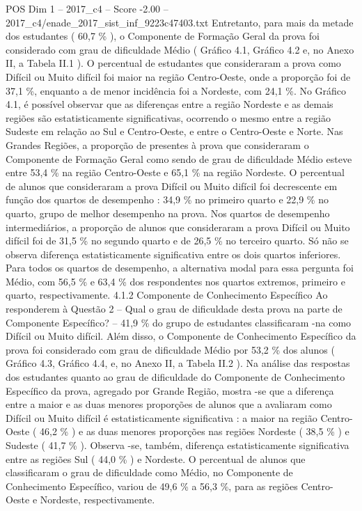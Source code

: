 \begin{textsample}{POS Dim 1 – 2017\_c4 – Score -2.00 – 2017\_c4/enade\_2017\_sist\_inf\_9223c47403.txt}
Entretanto, para mais da metade dos estudantes ( 60,7 \% ), o Componente de Formação Geral da prova foi considerado com grau de dificuldade Médio ( Gráfico 4.1, Gráfico 4.2 e, no Anexo II, a Tabela II.1 ).
O percentual de estudantes que consideraram a prova como Difícil ou Muito difícil foi maior na região Centro-Oeste, onde a proporção foi de 37,1 \%, enquanto a de menor incidência foi a Nordeste, com 24,1 \%.
No Gráfico 4.1, é possível observar que as diferenças entre a região Nordeste e as demais regiões são estatisticamente significativas, ocorrendo o mesmo entre a região Sudeste em relação ao Sul e Centro-Oeste, e entre o Centro-Oeste e Norte.
Nas Grandes Regiões, a proporção de presentes à prova que consideraram o Componente de Formação Geral como sendo de grau de dificuldade Médio esteve entre 53,4 \% na região Centro-Oeste e 65,1 \% na região Nordeste.
O percentual de alunos que consideraram a prova Difícil ou Muito difícil foi decrescente em função dos quartos de desempenho : 34,9 \% no primeiro quarto e 22,9 \% no quarto, grupo de melhor desempenho na prova.
Nos quartos de desempenho intermediários, a proporção de alunos que consideraram a prova Difícil ou Muito difícil foi de 31,5 \% no segundo quarto e de 26,5 \% no terceiro quarto.
Só não se observa diferença estatisticamente significativa entre os dois quartos inferiores.
Para todos os quartos de desempenho, a alternativa modal para essa pergunta foi Médio, com 56,5 \% e 63,4 \% dos respondentes nos quartos extremos, primeiro e quarto, respectivamente. 4.1.2 Componente de Conhecimento Específico Ao responderem à Questão 2 – Qual o grau de dificuldade desta prova na parte de Componente Específico? – 41,9 \% do grupo de estudantes classificaram -na como Difícil ou Muito difícil.
Além disso, o Componente de Conhecimento Específico da prova foi considerado com grau de dificuldade Médio por 53,2 \% dos alunos ( Gráfico 4.3, Gráfico 4.4, e, no Anexo II, a Tabela II.2 ).
Na análise das respostas dos estudantes quanto ao grau de dificuldade do Componente de Conhecimento Específico da prova, agregado por Grande Região, mostra -se que a diferença entre a maior e as duas menores proporções de alunos que a avaliaram como Difícil ou Muito difícil é estatisticamente significativa : a maior na região Centro-Oeste ( 46,2 \% ) e as duas menores proporções nas regiões Nordeste ( 38,5 \% ) e Sudeste ( 41,7 \% ).
Observa -se, também, diferença estatisticamente significativa entre as regiões Sul ( 44,0 \% ) e Nordeste.
O percentual de alunos que classificaram o grau de dificuldade como Médio, no Componente de Conhecimento Específico, variou de 49,6 \% a 56,3 \%, para as regiões Centro-Oeste e Nordeste, respectivamente.

\end{textsample}
